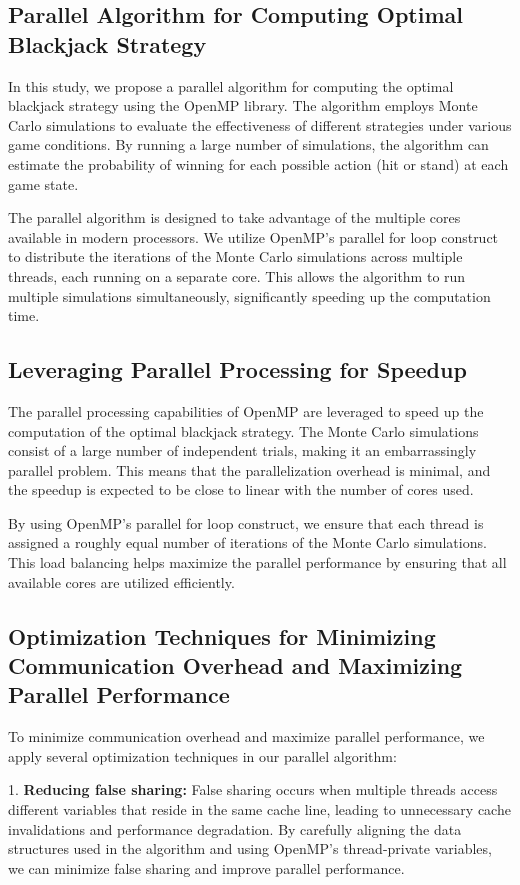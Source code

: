 \documentclass[12pt]{article}
\begin{document}
\subsection{Parallel Algorithm for Computing Optimal Blackjack Strategy}
In this study, we propose a parallel algorithm for computing the optimal blackjack strategy using the OpenMP library. The algorithm employs Monte Carlo simulations to evaluate the effectiveness of different strategies under various game conditions. By running a large number of simulations, the algorithm can estimate the probability of winning for each possible action (hit or stand) at each game state.

The parallel algorithm is designed to take advantage of the multiple cores available in modern processors. We utilize OpenMP's parallel for loop construct to distribute the iterations of the Monte Carlo simulations across multiple threads, each running on a separate core. This allows the algorithm to run multiple simulations simultaneously, significantly speeding up the computation time.

\subsection{Leveraging Parallel Processing for Speedup}
The parallel processing capabilities of OpenMP are leveraged to speed up the computation of the optimal blackjack strategy. The Monte Carlo simulations consist of a large number of independent trials, making it an embarrassingly parallel problem. This means that the parallelization overhead is minimal, and the speedup is expected to be close to linear with the number of cores used.

By using OpenMP's parallel for loop construct, we ensure that each thread is assigned a roughly equal number of iterations of the Monte Carlo simulations. This load balancing helps maximize the parallel performance by ensuring that all available cores are utilized efficiently.

\subsection{Optimization Techniques for Minimizing Communication Overhead and Maximizing Parallel Performance}
To minimize communication overhead and maximize parallel performance, we apply several optimization techniques in our parallel algorithm:

1. \textbf{Reducing false sharing:} False sharing occurs when multiple threads access different variables that reside in the same cache line, leading to unnecessary cache invalidations and performance degradation. By carefully aligning the data structures used in the algorithm and using OpenMP's thread-private variables, we can minimize false sharing and improve parallel performance.
\end{document}
